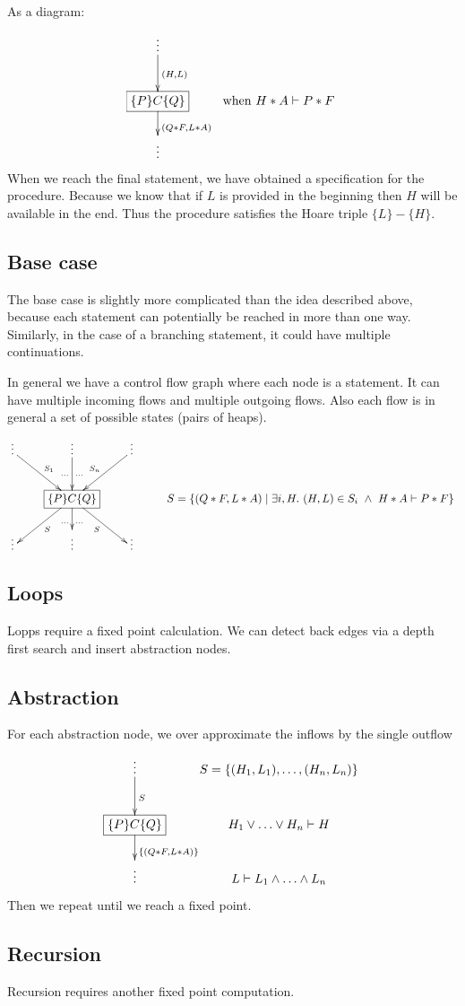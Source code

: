 \documentclass{article}
\newcommand{\ts}{\vdash}
\newcommand{\hoare}[3]{\{#1\}#2\{#3\}}
\newcommand{\set}[2]{\{#1 \mid #2\}}
\begin{document}
As a diagram:
\[
\xymatrix{
{\vdots} \ar[d]^{(H, L)} \\
*+[F]{\hoare P C Q} \ar[d]^{(Q * F, L * A)} &
{\mathrm{when}\ H * A \ts P * F} \\
{\vdots}
}
\]
When we reach the final statement, we have obtained a specification
for the procedure. Because we know that if $L$ is provided in the
beginning then $H$ will be available in the end. Thus the procedure
satisfies the Hoare triple $\hoare L - H$.
\subsection{Base case}\label{sec:symbexe:base}
The base case is slightly more complicated than the idea described
above, because each statement can potentially be reached in more than
one way. Similarly, in the case of a branching statement, it could
have multiple continuations.

In general we have a control flow graph where each node is a
statement. It can have multiple incoming flows and multiple outgoing
flows. Also each flow is in general a set of possible states (pairs of
heaps).
\[
\xymatrix{
{\vdots} \ar[dr]^{S_1} & {\vdots} \ar[d]_{\ldots}^{\ldots} & {\vdots} \ar[dl]_{S_n} \\
& *+[F]{\hoare P C Q} \ar[dl]^{S} \ar[d]_{\ldots}^{\ldots} \ar[dr]_{S}
& & S = \set{(Q * F, L * A)}{\exists i, H.\ (H, L)\in S_i\ \land\ H * A \ts P * F} \\
{\vdots} & {\vdots} & {\vdots}
}
\]
\subsection{Loops}\label{sec:symbexe:loops}
Lopps require a fixed point calculation. We can detect back edges via
a depth first search and insert abstraction nodes.
\subsection{Abstraction}\label{sec:symbexe:abstraction}
For each abstraction node, we over approximate the inflows by the single outflow
\[
\xymatrix{
{\vdots} \ar[d]^{S} & {S = \{(H_1, L_1), \ldots, (H_n, L_n)\}}\\
*+[F]{\hoare P C Q} \ar[d]^{\{(Q * F, L * A)\}} & H_1 \lor \ldots \lor H_n \ts H \\
{\vdots} & L \ts L_1 \land \ldots \land L_n
}
\]
Then we repeat until we reach a fixed point.
\subsection{Recursion}\label{sec:symbexe:recursion}
Recursion requires another fixed point computation.
\end{document}
